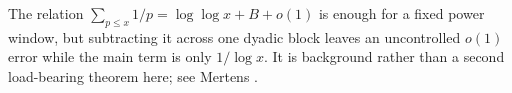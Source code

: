 \begin{remark}
The relation $\sum_{p\le x}1/p=\log\log x+B+o(1)$ is enough for a fixed power
window, but subtracting it across one dyadic block leaves an uncontrolled
$o(1)$ error while the main term is only $1/\log x$.  It is background rather
than a second load-bearing theorem here; see Mertens \cite{Mertens1874}.
\end{remark}

